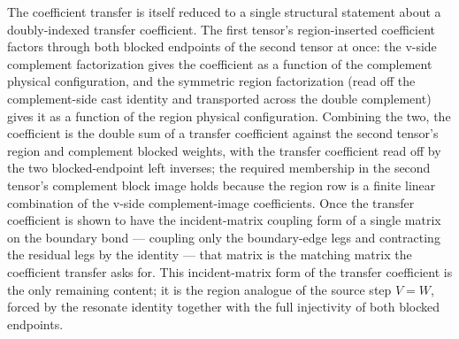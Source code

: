 \documentclass{article}
\begin{document}
\begin{enumerate}
          The coefficient transfer is itself reduced to a single structural
          statement about a doubly-indexed transfer coefficient. The first tensor's
          region-inserted coefficient factors through both blocked endpoints of the
          second tensor at once: the v-side complement factorization gives the
          coefficient as a function of the complement physical configuration, and
          the symmetric region factorization (read off the complement-side cast
          identity and transported across the double complement) gives it as a
          function of the region physical configuration. Combining the two, the
          coefficient is the double sum of a transfer coefficient against the second
          tensor's region and complement blocked weights, with the transfer
          coefficient read off by the two blocked-endpoint left inverses; the
          required membership in the second tensor's complement block image holds
          because the region row is a finite linear combination of the v-side
          complement-image coefficients. Once the transfer coefficient is shown to
          have the incident-matrix coupling form of a single matrix on the boundary
          bond --- coupling only the boundary-edge legs and contracting the residual
          legs by the identity --- that matrix is the matching matrix the
          coefficient transfer asks for. This incident-matrix form of the transfer
          coefficient is the only remaining content; it is the region analogue of
          the source step \(V=W\), forced by the resonate identity together with the
          full injectivity of both blocked endpoints.


\end{enumerate}
\end{document}
